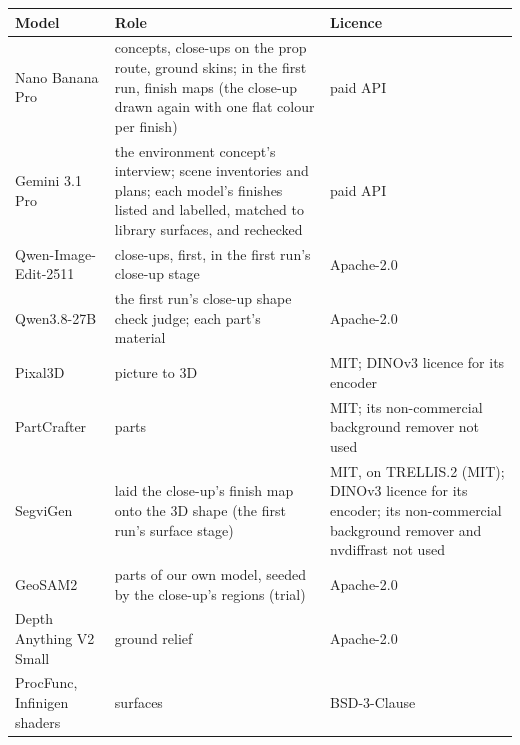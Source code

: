 {\def\LTcaptype{none} %
\begin{longtable}[]{@{}
  >{\raggedright\arraybackslash}p{}
  >{\raggedright\arraybackslash}p{}
  >{\raggedright\arraybackslash}p{}@{}}
\toprule\noalign{}
\begin{minipage}[b]{\linewidth}\raggedright
Model
\end{minipage} & \begin{minipage}[b]{\linewidth}\raggedright
Role
\end{minipage} & \begin{minipage}[b]{\linewidth}\raggedright
Licence
\end{minipage} \\
\midrule\noalign{}
\endhead
\bottomrule\noalign{}
\endlastfoot
Nano Banana Pro \citep{nanobananapro} & concepts, close-ups on the prop route, ground skins; in the first run, finish maps (the close-up drawn again with one flat colour per finish) & paid API \\
Gemini 3.1 Pro \citep{gemini31pro} & the environment concept's interview; scene inventories and plans; each model's finishes listed and labelled, matched to library surfaces, and rechecked & paid API \\
Qwen-Image-Edit-2511 \citep{qwenimageedit} & close-ups, first, in the first run's close-up stage & Apache-2.0 \\
Qwen3.8-27B \citep{qwen38} & the first run's close-up shape check judge; each part's material & Apache-2.0 \\
Pixal3D \citep{li2026pixal3d} & picture to 3D & MIT; DINOv3 licence \citep{simeoni2025dinov3} for its encoder \\
PartCrafter \citep{lin2025partcrafter} & parts & MIT; its non-commercial background remover not used \\
SegviGen \citep{li2026segvigen} & laid the close-up's finish map onto the 3D shape (the first run's surface stage) & MIT, on TRELLIS.2 (MIT); DINOv3 licence for its encoder; its non-commercial background remover and nvdiffrast not used \\
GeoSAM2 \citep{deng2025geosam2} & parts of our own model, seeded by the close-up's regions (trial) & Apache-2.0 \\
Depth Anything V2 Small \citep{yang2024dav2} & ground relief & Apache-2.0 \\
ProcFunc, Infinigen shaders & surfaces & BSD-3-Clause \\

\end{longtable}}
